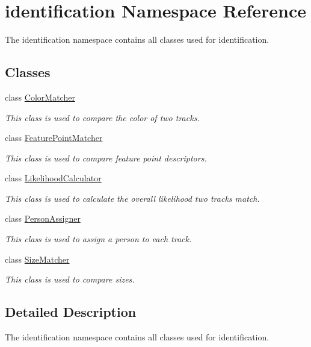 \hypertarget{namespaceidentification}{}\section{identification Namespace Reference}
\label{namespaceidentification}


The identification namespace contains all classes used for identification.  


\subsection*{Classes}
\begin{DoxyCompactItemize}
\item 
class \mbox{\hyperlink{classidentification_1_1_color_matcher}{Color\+Matcher}}
\begin{DoxyCompactList}\small\item\em This class is used to compare the color of two tracks. \end{DoxyCompactList}\item 
class \mbox{\hyperlink{classidentification_1_1_feature_point_matcher}{Feature\+Point\+Matcher}}
\begin{DoxyCompactList}\small\item\em This class is used to compare feature point descriptors. \end{DoxyCompactList}\item 
class \mbox{\hyperlink{classidentification_1_1_likelihood_calculator}{Likelihood\+Calculator}}
\begin{DoxyCompactList}\small\item\em This class is used to calculate the overall likelihood two tracks match. \end{DoxyCompactList}\item 
class \mbox{\hyperlink{classidentification_1_1_person_assigner}{Person\+Assigner}}
\begin{DoxyCompactList}\small\item\em This class is used to assign a person to each track. \end{DoxyCompactList}\item 
class \mbox{\hyperlink{classidentification_1_1_size_matcher}{Size\+Matcher}}
\begin{DoxyCompactList}\small\item\em This class is used to compare sizes. \end{DoxyCompactList}\end{DoxyCompactItemize}


\subsection{Detailed Description}
The identification namespace contains all classes used for identification. 